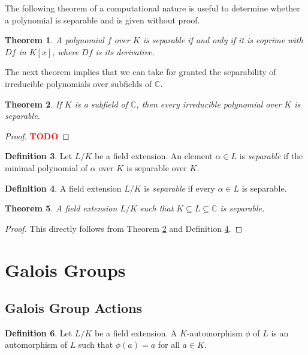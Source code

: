 \documentclass[12pt]{article}
\newtheorem{theorem}{Theorem}
\theoremstyle{definition}
\newtheorem{definition}[theorem]{Definition}
\newcommand{\C}{\mathbb C}
\newcommand{\TODO}{\textbf{\textcolor{red}{TODO}}}
\begin{document}
The following theorem of a computational nature is useful to determine whether a polynomial is separable and is given without proof. 

\begin{theorem} \label{thm:separable-derivative}
    A polynomial $f$ over $K$ is separable if and only if it is coprime with $Df$ in $K[x]$, where $Df$ is its derivative. 
\end{theorem}

The next theorem implies that we can take for granted the separability of irreducible polynomials over subfields of $\C$. 

\begin{theorem} \label{thm:separable-poly-in-C}
    If $K$ is a subfield of $\C$, then every irreducible polynomial over $K$ is separable. 
\end{theorem}

\begin{proof}
    \TODO
\end{proof}

\begin{definition}
    Let $L/K$ be a field extension. An element $\alpha \in L$ is \textit{separable} if the minimal polynomial of $\alpha$ over $K$ is separable over $K$.
\end{definition}

\begin{definition} \label{def:separable-extension}
    A field extension $L / K$ is \textit{separable} if every $\alpha \in L$ is separable.
\end{definition}

\begin{theorem}
    A field extension $L/K$ such that $K \subseteq L \subseteq \mathbb C$ is separable. 
\end{theorem}

\begin{proof}
    This directly follows from Theorem \ref{thm:separable-poly-in-C} and Definition \ref{def:separable-extension}. 
\end{proof}

\section{Galois Groups}
\subsection{Galois Group Actions}

\begin{definition}
	Let $L/K$ be a field extension. A $K$-automorphism $\phi$ of $L$ is an automorphism of $L$ such that $\phi(a) = a$ for all $a \in K$. 
\end{definition}
\end{document}
